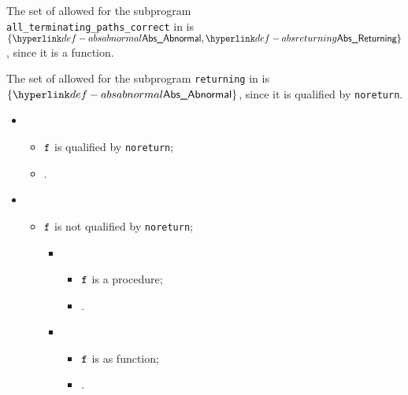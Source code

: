 The set of \Proseabstractconfigurations{} allowed for the subprogram \\
\verb|all_terminating_paths_correct|
in  is $\{\AbsAbnormal, \AbsReturning\}$, since it is
a function.

The set of \Proseabstractconfigurations{} allowed for the subprogram \verb|returning|
in  is $\{\AbsAbnormal\}$, since it is qualified
by \verb|noreturn|.

\ProseParagraph
\OneApplies
\begin{itemize}
  \item {}
  \begin{itemize}
    \item $\texttt{f}$ is qualified by \verb|noreturn|;
    \item {}.
  \end{itemize}

  \item \AllApply
  \begin{itemize}
    \item $\texttt{f}$ is not qualified by \verb|noreturn|;
    \OneApplies
    \begin{itemize}
      \item {}
      \begin{itemize}
        \item $\texttt{f}$ is a procedure;
        \item {}.
      \end{itemize}

      \item {}
      \begin{itemize}
        \item $\texttt{f}$ is as function;
        \item {}.
      \end{itemize}
    \end{itemize}
  \end{itemize}

\end{itemize}

